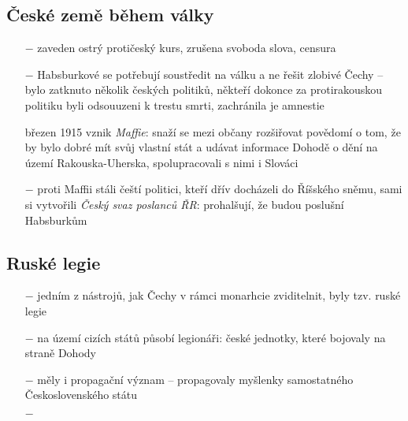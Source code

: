 \documentclass{article}
\begin{document}
\subsection*{České země během války}
\begin{itemize}
    \vspace{-0.5em}
    \setlength\itemsep{0.15em}
    \item[$-$] zaveden ostrý protičeský kurs, zrušena svoboda slova, censura
    \item[$-$] Habsburkové se potřebují soustředit na válku a ne řešit zlobivé Čechy -- bylo zatknuto několik českých politiků, někteří dokonce za protirakouskou politiku byli odsouuzeni k trestu smrti, zachránila je amnestie
    \item[březen 1915] vznik \textit{Maffie}: snaží se mezi občany rozšiřovat povědomí o tom, že by bylo dobré mít svůj vlastní stát a udávat informace Dohodě o dění na území Rakouska-Uherska, spolupracovali s nimi i Slováci
    \item[$-$] proti Maffii stáli čeští politici, kteří dřív docházeli do Říšského sněmu, sami si vytvořili \textit{Český svaz poslanců ŘR}: prohalšují, že budou poslušní Habsburkům
\end{itemize}

\subsection*{Ruské legie}
\begin{itemize}
    \vspace{-0.5em}
    \setlength\itemsep{0.15em}
    \item[$-$] jedním z nástrojů, jak Čechy v rámci monarhcie zviditelnit, byly tzv. ruské legie
    \item[$-$] na území cizích států působí legionáři: české jednotky, které bojovaly na straně Dohody
    \item[$-$] měly i propagační význam -- propagovaly myšlenky samostatného Československého státu
    \item[$-$] 
\end{itemize}
\end{document}
